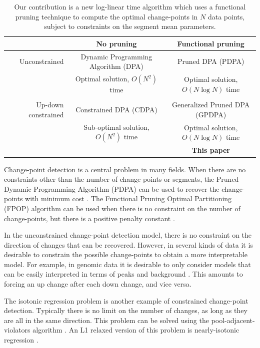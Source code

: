 \documentclass{article}
\begin{document}
\begin{table}
  \centering
  \begin{tabular}{r|c|c}
    & No pruning & Functional pruning \\
    \hline
    Unconstrained & Dynamic Programming Algorithm (DPA) & Pruned DPA (PDPA) \\
    & Optimal solution, $O(N^2)$ time & Optimal solution, $O(N\log N)$ time\\
    & \citet{segment-neighborhood, optimal-partitioning}     & \citet{pruned-dp, johnson} \\
    \hline
    Up-down constrained & Constrained DPA (CDPA) & Generalized Pruned DPA (GPDPA) \\
    & Sub-optimal solution, $O(N^2)$ time & Optimal solution, $O(N\log N)$ time\\
    & \citet{HOCKING-PeakSeg} & \textbf{This paper} \\
    \hline
  \end{tabular}
  \caption{Our contribution is a new log-linear time 
    algorithm which uses a functional pruning technique 
    to compute the optimal change-points in $N$ data points,
    subject to constraints on the segment mean parameters.}
\label{tab:contribution}
\end{table}
Change-point detection is a central problem in many fields. When there
are no constraints other than the number of change-points or segments,
the Pruned Dynamic Programming Algorithm (PDPA) can be used to recover
the change-points with minimum cost \citep{pruned-dp}. The Functional
Pruning Optimal Partitioning (FPOP) algorithm can be used when there
is no constraint on the number of change-points, but there is a
positive penalty constant \citep{FPOP}. 

In the unconstrained change-point detection model, there is no
constraint on the direction of changes that can be recovered. However,
in several kinds of data it is desirable to constrain the possible
change-points to obtain a more interpretable model. For example, in
genomic data it is desirable to only consider models that can be
easily interpreted in terms of peaks and background
\citep{HOCKING-PeakSeg}. This amounts to forcing an up change after each down
change, and vice versa.

The isotonic regression problem is another example of constrained
change-point detection. Typically there is no limit on the number of
changes, as long as they are all in the same direction. This problem
can be solved using the pool-adjacent-violators algorithm
\citep{mair2009isotone}. An L1 relaxed version of this problem is
nearly-isotonic regression \citep{tibshirani2011nearly}.
\end{document}
